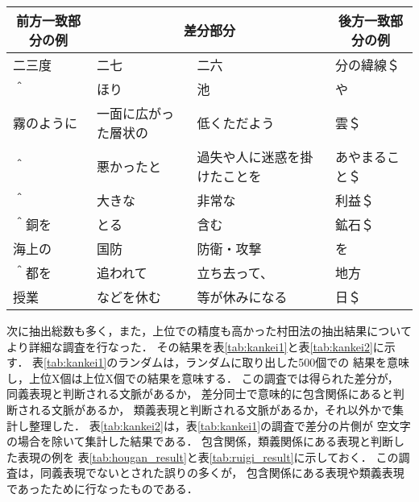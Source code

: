 \begin{table*}[t]
\small
  \begin{center}
    \leavevmode
    \caption{類義関係にある表現の例}
    \label{tab:ruigi_result}
\begin{tabular}[h]{|l|l|l|l|}\hline
\multicolumn{1}{|c|}{前方一致部分の例} & \multicolumn{2}{|c|}{差分部分} & \multicolumn{1}{|c|}{後方一致部分の例}\\\hline
二三度               & 二七       & 二六       & 分の緯線＄          \\
＾                   & ほり       & 池         & や                  \\
霧のように           & 一面に広がった層状の & 低くただよう & 雲＄                \\
＾                   & 悪かったと & 過失や人に迷惑を掛けたことを & あやまること＄      \\
＾                   & 大きな     & 非常な     & 利益＄              \\
＾銅を               & とる       & 含む       & 鉱石＄              \\
海上の               & 国防       & 防衛・攻撃 & を                  \\
＾都を               & 追われて   & 立ち去って、 & 地方                \\
授業                 & などを休む & 等が休みになる & 日＄                \\\hline
\end{tabular}
  \end{center}
\end{table*}

次に抽出総数も多く，また，上位での精度も高かった村田法の抽出結果について
より詳細な調査を行なった．
その結果を表\ref{tab:kankei1}と表\ref{tab:kankei2}に示す．
表\ref{tab:kankei1}のランダムは，ランダムに取り出した500個での
結果を意味し，上位X個は上位X個での結果を意味する．
この調査では得られた差分が，
同義表現と判断される文脈があるか，
差分同士で意味的に包含関係にあると判断される文脈があるか，
類義表現と判断される文脈があるか，それ以外かで集計し整理した．
表\ref{tab:kankei2}は，表\ref{tab:kankei1}の調査で差分の片側が
空文字の場合を除いて集計した結果である．
包含関係，類義関係にある表現と判断した表現の例を
表\ref{tab:hougan_result}と表\ref{tab:ruigi_result}に示しておく．
この調査は，同義表現でないとされた誤りの多くが，
包含関係にある表現や類義表現であったために行なったものである．

